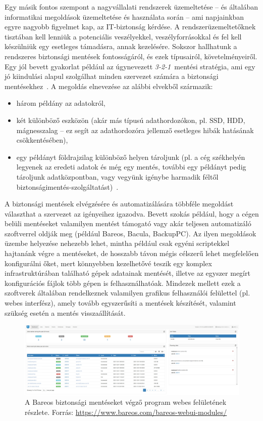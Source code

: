Egy másik fontos szempont a nagyvállalati rendszerek üzemeltetése -- és általában informatikai megoldások üzemeltetése és használata során -- ami napjainkban egyre nagyobb figyelmet kap, az IT-biztonság kérdése. A rendszerüzemeltetőknek tisztában kell lenniük a potenciális veszélyekkel, veszélyforrásokkal és fel kell készülniük egy esetleges támadásra, annak kezelésére. Sokszor hallhatunk a rendszeres biztonsági mentések fontosságáról, és ezek típusairól, követelményeiről. Egy jól bevett gyakorlat például az úgynevezett \textit{\mbox{3-2-1}}~mentési stratégia, ami egy jó kiindulási alapul szolgálhat minden szervezet számára a biztonsági mentésekhez~\cite{Backblaze321}.
A megoldás elnevezése az alábbi elvekből származik:
\begin{itemize}
	\item három példány az adatokról,
	\item két különböző eszközön (akár más típusú adathordozókon, pl. SSD, HDD, mágnesszalag -- ez segít az adathordozóra jellemző esetleges hibák hatásának csökkentésében),
	\item egy példányt földrajzilag különböző helyen tároljunk (pl. a cég székhelyén legyenek az eredeti adatok és még egy mentés, további egy példányt pedig tároljunk adatközpontban, vagy vegyünk igénybe harmadik féltől biztonságimentés-szolgáltatást)~\cite{Seagate321}.
\end{itemize}

A biztonsági mentések elvégzésére és automatizálására többféle megoldást választhat a szervezet az igényeihez igazodva. Bevett szokás például, hogy a cégen belüli mentéseket valamilyen mentést támogató vagy akár teljesen automatizáló szoftverrel oldják meg (például Bareos, Bacula, BackupPC). Az ilyen megoldások üzembe helyezése nehezebb lehet, mintha például csak egyéni scriptekkel hajtanánk végre a mentéseket, de hosszabb távon mégis célszerű lehet megfelelően konfigurálni őket, mert könnyebben kezelhetővé teszik egy komplex infrastruktúrában található gépek adatainak mentését, illetve az egyszer megírt konfigurációs fájlok több gépen is felhasználhatóak. Mindezek mellett ezek a szoftverek általában rendelkeznek valamilyen grafikus felhasználói felülettel (pl. webes interfész), amely tovább egyszerűsíti a mentések készítését, valamint szükség esetén a mentés visszaállítását.

\begin{figure}[!ht]
	\centering
	\includegraphics[width=150mm, keepaspectratio]{figures/bareos-dashboard.png}
	\caption{A Bareos biztonsági mentéseket végző program webes felületének részlete. Forrás: \url{https://www.bareos.com/bareos-webui-modules/}}
	\label{fig:bareos}
\end{figure}

